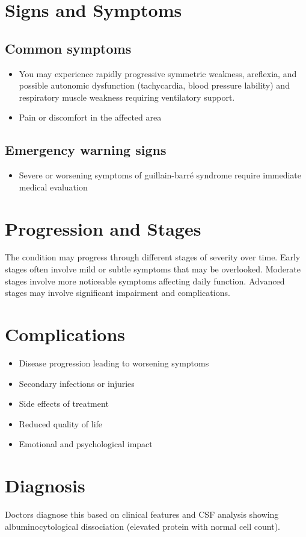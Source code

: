 \section{Signs and Symptoms}

\subsection{Common symptoms}
\begin{itemize}[noitemsep]
  \item You may experience rapidly progressive symmetric weakness, areflexia, and possible autonomic dysfunction (tachycardia, blood pressure lability) and respiratory muscle weakness requiring ventilatory support.
  \item Pain or discomfort in the affected area
  \end{itemize}

\subsection{Emergency warning signs}
\begin{itemize}[noitemsep]
  \item Severe or worsening symptoms of guillain-barr\'{e} syndrome require immediate medical evaluation
\end{itemize}
\section{Progression and Stages}
The condition may progress through different stages of severity over time. Early stages often involve mild or subtle symptoms that may be overlooked. Moderate stages involve more noticeable symptoms affecting daily function. Advanced stages may involve significant impairment and complications.
\section{Complications}
\begin{itemize}[noitemsep]
  \item Disease progression leading to worsening symptoms
  \item Secondary infections or injuries
  \item Side effects of treatment
  \item Reduced quality of life
  \item Emotional and psychological impact
\end{itemize}
\section{Diagnosis}
Doctors diagnose this based on clinical features and CSF analysis showing albuminocytological dissociation (elevated protein with normal cell count).

